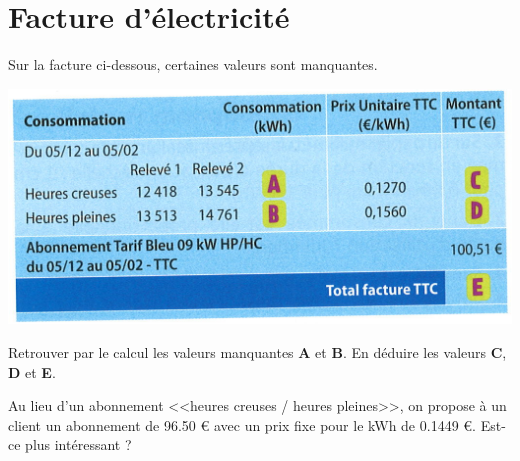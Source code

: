 \section{Facture d'électricité}

Sur la facture ci-dessous, certaines valeurs sont manquantes.

\begin{center}
	\includegraphics[scale=0.5]{img/facture}
\end{center}

\begin{questions}
	\question Retrouver par le calcul les valeurs manquantes \textbf{A} et \textbf{B}. En déduire les valeurs \textbf{C}, \textbf{D} et \textbf{E}.
	
	\fillwithdottedlines{4cm}
	
	\question Au lieu d'un abonnement <<heures creuses / heures pleines>>, on propose à un client un abonnement de \num{96.50} € avec un prix fixe pour le kWh de \num{0.1449} €. Est-ce plus intéressant ?
	
	\fillwithdottedlines{4cm}
	
	
\end{questions}